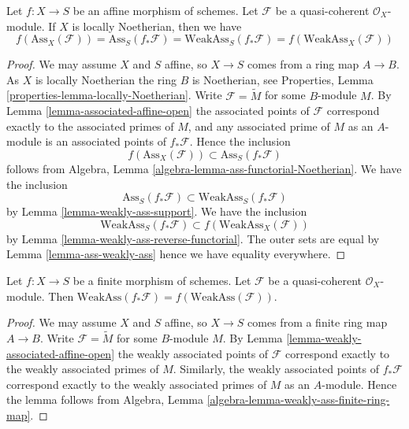 \begin{lemma}
\label{lemma-ass-functorial-equal}
Let $f : X \to S$ be an affine morphism of schemes.
Let $\mathcal{F}$ be a quasi-coherent $\mathcal{O}_X$-module.
If $X$ is locally Noetherian, then we have
$$
f(\text{Ass}_X(\mathcal{F})) =
\text{Ass}_S(f_*\mathcal{F}) =
\text{WeakAss}_S(f_*\mathcal{F}) =
f(\text{WeakAss}_X(\mathcal{F}))
$$
\end{lemma}

\begin{proof}
We may assume $X$ and $S$ affine, so $X \to S$ comes from a ring map
$A \to B$. As $X$ is locally Noetherian the ring $B$ is Noetherian, see
Properties, Lemma \ref{properties-lemma-locally-Noetherian}.
Write $\mathcal{F} = \widetilde M$ for some $B$-module $M$. By
Lemma \ref{lemma-associated-affine-open}
the associated points of $\mathcal{F}$ correspond exactly to the associated
primes of $M$, and any associated prime of $M$ as an $A$-module is an
associated points of $f_*\mathcal{F}$.
Hence the inclusion
$$
f(\text{Ass}_X(\mathcal{F})) \subset \text{Ass}_S(f_*\mathcal{F})
$$
follows from
Algebra, Lemma \ref{algebra-lemma-ass-functorial-Noetherian}.
We have the inclusion
$$
\text{Ass}_S(f_*\mathcal{F}) \subset \text{WeakAss}_S(f_*\mathcal{F})
$$
by
Lemma \ref{lemma-weakly-ass-support}.
We have the inclusion
$$
\text{WeakAss}_S(f_*\mathcal{F}) \subset f(\text{WeakAss}_X(\mathcal{F}))
$$
by
Lemma \ref{lemma-weakly-ass-reverse-functorial}.
The outer sets are equal by
Lemma \ref{lemma-ass-weakly-ass}
hence we have equality everywhere.
\end{proof}

\begin{lemma}
\label{lemma-weakly-associated-finite}
Let $f : X \to S$ be a finite morphism of schemes.
Let $\mathcal{F}$ be a quasi-coherent $\mathcal{O}_X$-module.
Then $\text{WeakAss}(f_*\mathcal{F}) = f(\text{WeakAss}(\mathcal{F}))$.
\end{lemma}

\begin{proof}
We may assume $X$ and $S$ affine, so $X \to S$ comes from a finite ring map
$A \to B$. Write $\mathcal{F} = \widetilde M$ for some $B$-module $M$. By
Lemma \ref{lemma-weakly-associated-affine-open}
the weakly associated points of $\mathcal{F}$ correspond exactly to the
weakly associated primes of $M$. Similarly, the weakly associated points
of $f_*\mathcal{F}$ correspond exactly to the weakly associated primes
of $M$ as an $A$-module. Hence the lemma follows from
Algebra, Lemma \ref{algebra-lemma-weakly-ass-finite-ring-map}.
\end{proof}

